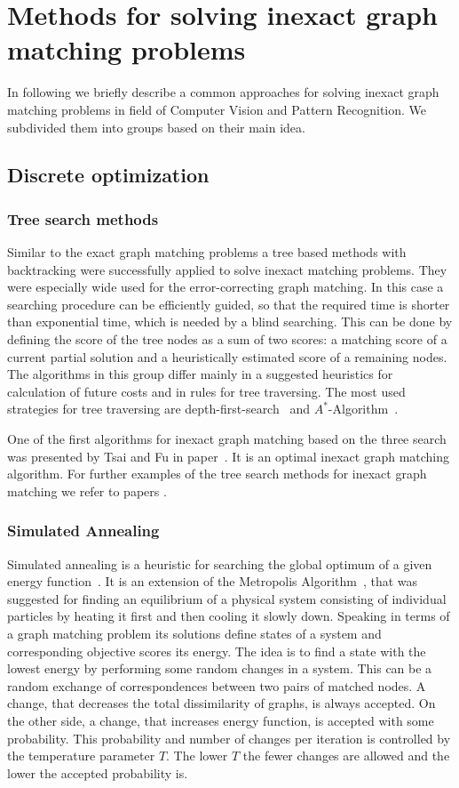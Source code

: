 \section{Methods for solving inexact graph matching problems}
In following we briefly describe a common approaches for solving inexact graph matching problems in field of Computer Vision and Pattern Recognition. We subdivided them into groups based on their main idea.
\subsection{Discrete optimization}
\subsubsection{Tree search methods}
Similar to the exact graph matching problems a tree based methods with backtracking were successfully applied to solve inexact matching problems. They were especially wide used for the error-correcting graph matching. In this case a searching procedure can be efficiently guided, so that the required time is shorter than exponential time, which is needed by a blind searching. This can be done by defining the score of the tree nodes as a sum of two scores: a matching score of a current partial solution and a heuristically estimated score of a remaining nodes. The algorithms in this group differ mainly in a suggested heuristics for calculation of future costs and in rules for tree traversing. The most used strategies for tree traversing are depth-first-search~\cite{Cormen} and $A^*$-Algorithm~\cite{AStar}.

One of the first algorithms for inexact graph matching based on the three search was presented by Tsai and Fu in paper~\cite{Fu1979}. It is an optimal inexact graph matching algorithm. For further examples of the tree search methods for inexact graph matching we refer to papers \cite{Bunke1983_inexactGM,Shapiro1981,Wang1995}.
\subsubsection{Simulated Annealing}
Simulated annealing is a heuristic for searching the global optimum of a given energy function~\cite{Burkard98thequadratic}. It is an extension of the Metropolis Algorithm~\cite{Metropolis}, that was suggested for finding an equilibrium of a physical system consisting of individual particles by heating it first and then cooling it slowly down. Speaking in terms of a graph matching problem its solutions define states of a system and corresponding objective scores its energy. The idea is to find a state with the lowest energy by performing some random changes in a system. This can be a random exchange of correspondences between two pairs of matched nodes. A change, that decreases the total dissimilarity of graphs, is always accepted. On the other side, a change, that increases energy function, is accepted with some probability. This probability and number of changes per iteration is controlled by the temperature parameter $T$. The lower $T$ the fewer changes are allowed and the lower the accepted probability is. 

